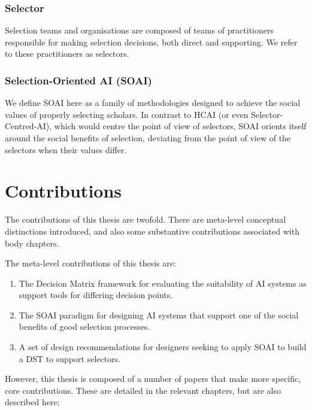 \subsubsection{Selector}
Selection teams and organisations are composed of teams of practitioners responsible for making selection decisions, both direct and supporting. We refer to these practitioners as selectors.

\subsubsection{Selection-Oriented AI (SOAI)} 
We define SOAI here as a family of methodologies designed to achieve the social values of properly selecting scholars. In contrast to HCAI (or even Selector-Centred-AI), which would centre the point of view of selectors, SOAI orients itself around the social benefits of selection, deviating from the point of view of the selectors when their values differ.

\section{Contributions} 
The contributions of this thesis are twofold. There are meta-level conceptual distinctions introduced, and also some substantive contributions associated with body chapters.

The meta-level contributions of this thesis are:

\begin{enumerate}
    \item The Decision Matrix framework for evaluating the suitability of AI systems as support tools for differing decision points.
    \item The SOAI paradigm for designing AI systems that support one of the social benefits of good selection processes.
    \item A set of design recommendations for designers seeking to apply SOAI to build a DST to support selectors.
\end{enumerate}

However, this thesis is composed of a number of papers that make more specific, core contributions. These are detailed in the relevant chapters, but are also described here:

